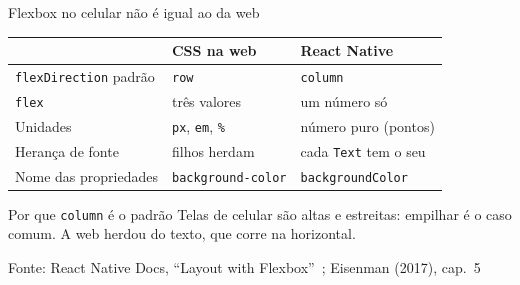 \documentclass[aspectratio=169]{beamer}
\newcommand{\fonte}[1]{\vfill\hfill{\scriptsize\textcolor{UFSGray}{Fonte: #1}}}
\begin{document}
\begin{frame}{Flexbox no celular não é igual ao da web}
  \begin{center}
  \small
  \begin{tabular}{@{}lll@{}}
    \toprule
      & \textbf{CSS na web} & \textbf{React Native} \\
    \midrule
    \texttt{flexDirection} padrão & \texttt{row}                & \texttt{column} \\
    \texttt{flex}                 & três valores               & um número só \\
    Unidades                      & \texttt{px}, \texttt{em}, \texttt{\%} & número puro (pontos) \\
    Herança de fonte              & filhos herdam              & cada \texttt{Text} tem o seu \\
    Nome das propriedades         & \texttt{background-color}   & \texttt{backgroundColor} \\
    \bottomrule
  \end{tabular}
  \end{center}
  \begin{block}{Por que \texttt{column} é o padrão}
    Telas de celular são altas e estreitas: empilhar é o caso comum.
    A web herdou do texto, que corre na horizontal.
  \end{block}
  \fonte{React Native Docs, ``Layout with Flexbox''~\cite{reactnative2025docs};
         Eisenman (2017), cap.\ 5~\cite{eisenman2017learning}}
\end{frame}
\end{document}
